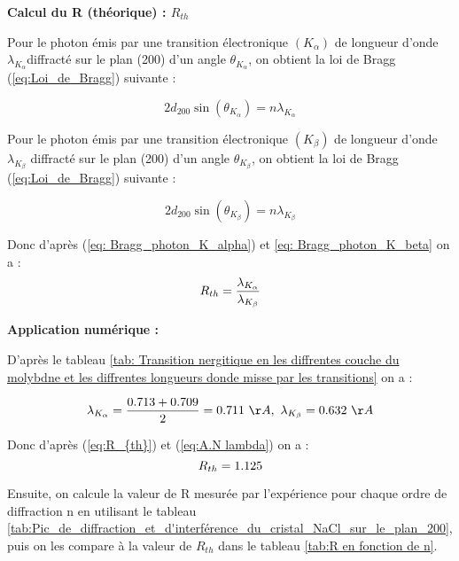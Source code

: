  \begin{flushleft}
	\textbf{Calcul du R (théorique) : $R_{th}$}
\end{flushleft}


Pour le photon émis par une transition électronique $(K_{\alpha})$ de longueur d'onde $\lambda_{K_{\alpha}}$diffracté sur le plan (200) d'un angle $\theta_{K_{\alpha}}$, on obtient la loi de Bragg (\ref{eq:Loi_de_Bragg}) suivante :

\begin{equation}\label{eq: Bragg_photon_K_alpha}
	2 d_{200}\sin(\theta_{K_{\alpha}}) = n\lambda_{K_{\alpha}}
\end{equation}

Pour le photon émis par une transition électronique $(K_{\beta})$ de longueur d'onde $\lambda_{K_{\beta}}$ diffracté sur le plan (200) d'un angle $\theta_{K_{\beta}}$, on obtient la loi de Bragg (\ref{eq:Loi_de_Bragg}) suivante :

\begin{equation}\label{eq: Bragg_photon_K_beta}
	2 d_{200}\sin(\theta_{K_{\beta}}) = n\lambda_{K_{\beta}}
\end{equation}

Donc d'après (\ref{eq: Bragg_photon_K_alpha}) et \ref{eq: Bragg_photon_K_beta} on a :
\begin{equation}\label{eq:R_{th}}
	R_{th} = \frac{\lambda_{K_{\alpha}}}{\lambda_{K_{\beta}}} 
\end{equation}


 \begin{flushleft}
	\textbf{Application numérique :}
\end{flushleft}


D'après le tableau \ref{tab: Transition nergitique en les diffrentes couche du molybdne et les diffrentes longueurs donde misse par les transitions} on a :

\begin{equation}\label{eq:A.N lambda}
	\lambda_{K_{\alpha}} = \frac{0.713 + 0.709}{2} = 0.711 \ \AA, \ \lambda_{K_{\beta}} =0.632 \ \AA
\end{equation}

Donc d'après (\ref{eq:R_{th}}) et (\ref{eq:A.N lambda}) on a :  
\begin{equation}\label{eq:R_{th}_A.N}
	R_{th} = 1.125
\end{equation}

\newpage
Ensuite, on calcule la valeur de R mesurée par l'expérience pour chaque ordre de diffraction n en utilisant le tableau \ref{tab:Pic_de_diffraction_et_d'interférence_du_cristal_NaCl_sur_le_plan_200}, puis on les compare à la valeur de $R_{th}$ dans le tableau \ref{tab:R en fonction de n}.





